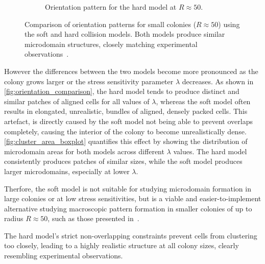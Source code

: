 \documentclass[conference]{IEEEtran}
\begin{document}
\begin{figure}[h]
\begin{subfigure}[b]{0.49\columnwidth}
        \caption{Orientation pattern for the hard model at $R \approx 50$.}
        \label{fig:packing_soft}
    \end{subfigure}
    \caption{Comparison of orientation patterns for small colonies ($R \approx 50$) using the soft and hard collision models. Both models produce similar microdomain structures, closely matching experimental observations~\cite{You2018}.}
    \label{fig:orientation_comparison_small}
\end{figure}

However the differences between the two models become more pronounced as the colony grows larger or the stress sensitivity parameter $\lambda$ decreases. As shown in \autoref{fig:orientation_comparison}, the hard model tends to produce distinct and similar patches of aligned cells for all values of $\lambda$, whereas the soft model often results in elongated, unrealistic, bundles of aligned, densely packed cells. This artefact, is directly caused by the soft model not being able to prevent overlaps completely, causing the interior of the colony to become unrealistically dense. \autoref{fig:cluster_area_boxplot} quantifies this effect by showing the distribution of microdomain areas for both models across different $\lambda$ values. The hard model consistently produces patches of similar sizes, while the soft model produces larger microdomains, especially at lower $\lambda$.

Therfore, the soft model is not suitable for studying microdomain formation in large colonies or at low stress sensitivities, but is a viable and easier-to-implement alternative studying macroscopic pattern formation in smaller colonies of up to radius $R \approx 50$, such as those presented in~\cite{You2018}.

The hard model's strict non-overlapping constraints prevent cells from clustering too closely, leading to a highly realistic structure at all colony sizes, clearly resembling experimental observations.
\end{document}
